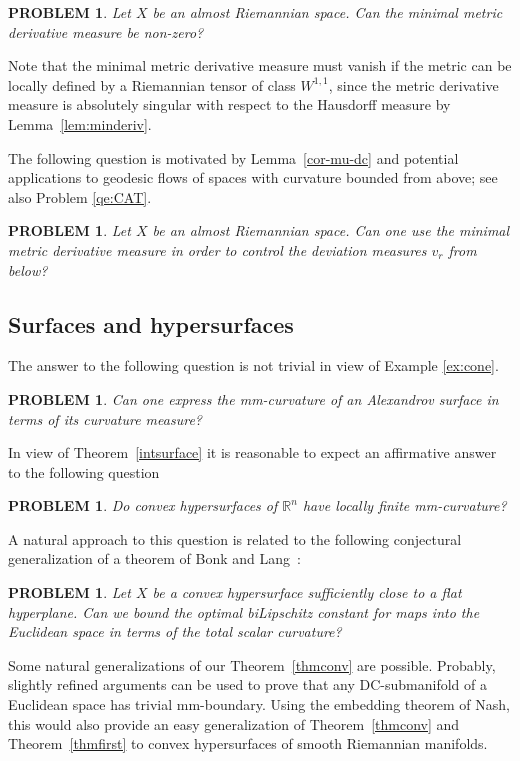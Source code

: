 \documentclass[12pt,leqno,intlimits]{amsart}
\numberwithin{equation}{section}
\newtheorem{quest}[thm]{PROBLEM}
\theoremstyle{definition}
\theoremstyle{remark}
\newcommand{\tref}[1]{Theorem~\ref{#1}}
\newcommand{\lref}[1]{Lemma~\ref{#1}}
\newcommand{\R}{\mathbb{R}}
\begin{document}
\begin{quest} \label{qe:min}
Let $X$ be an almost Riemannian space. Can  the minimal metric derivative measure be non-zero?
\end{quest}

 Note that the minimal metric derivative measure must vanish if the metric can be locally defined  by a Riemannian
tensor of class $W^{1,1}$,  since the metric derivative measure is absolutely singular with respect to the Hausdorff measure by \lref{lem:minderiv}.




The following question is motivated by  \lref{cor-mu-dc}   and potential  applications to geodesic flows of spaces with curvature bounded from above; see also  Problem \ref{qe:CAT}.

\begin{quest}  \label{qe:BV}
Let $X$ be an  almost Riemannian space. Can one use the minimal metric derivative measure in order  to control the deviation measures $v_r$ from below?
\end{quest}

\subsection{Surfaces and  hypersurfaces}
The answer to the following question is not trivial in view of  Example \ref{ex:cone}.


\begin{quest}
Can one express the mm-curvature of an Alexandrov  surface in terms of its curvature measure?
\end{quest}

In view of \tref{intsurface} it is reasonable  to expect  an affirmative answer to the following question
\begin{quest}
Do  convex hypersurfaces of $\R^n$ have locally finite mm-curvature?
\end{quest}


 A natural approach to this question is related to  the following conjectural generalization of a theorem of Bonk and Lang~\cite{Bonk-Lang}:
 \begin{quest}
 Let $X$ be a convex hypersurface sufficiently close to a flat  hyperplane. Can we bound the optimal biLipschitz constant for maps into the Euclidean space in terms of the total scalar curvature?
 \end{quest}

Some natural generalizations of our \tref{thmconv} are possible. Probably, slightly refined arguments can be used to
prove that any DC-submanifold of a Euclidean space has trivial mm-boundary. Using the embedding theorem of Nash, this would also provide an easy generalization of \tref{thmconv} and \tref{thmfirst} to convex hypersurfaces of smooth Riemannian manifolds.
\end{document}
